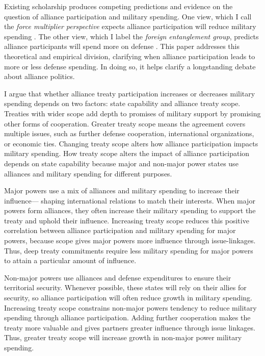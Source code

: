 \documentclass[12pt]{article}
\begin{document}
Existing scholarship produces competing predictions and evidence on the question of alliance participation and military spending. 
One view, which I call the \textit{force multiplier perspective} expects alliance participation will reduce military spending \citep{Morrow1993, Conybeare1994, DigiuseppePoast2016}. 
The other view, which I label the \textit{foreign entanglement group}, predicts alliance participants will spend more on defense \citep{Diehl1994, MorganPalmer2006}. 
This paper addresses this theoretical and empirical division, clarifying when alliance participation leads to more or less defense spending. 
In doing so, it helps clarify a longstanding debate about alliance politics.


I argue that whether alliance treaty participation increases or decreases military spending depends on two factors: state capability and alliance treaty scope. 
Treaties with wider scope add depth to promises of military support by promising other forms of cooperation.
Greater treaty scope means the agreement covers multiple issues, such as further defense cooperation, international organizations, or economic ties.  
Changing treaty scope alters how alliance participation impacts military spending. 
How treaty scope alters the impact of alliance participation depends on state capability because major and non-major power states use alliances and military spending for different purposes. 


Major powers use a mix of alliances and military spending to increase their influence--- shaping international relations to match their interests.
When major powers form alliances, they often increase their military spending to support the treaty and uphold their influence. 
Increasing treaty scope reduces this positive correlation between alliance participation and military spending for major powers, because scope gives major powers more influence through issue-linkages.
Thus, deep treaty commitments require less military spending for major powers to attain a particular amount of influence. 


Non-major powers use alliances and defense expenditures to ensure their territorial security.
Whenever possible, these states will rely on their allies for security, so alliance participation will often reduce growth in military spending.   
Increasing treaty scope constrains non-major powers tendency to reduce military spending through alliance participation. 
Adding further cooperation makes the treaty more valuable and gives partners greater influence through issue linkages. 
Thus, greater treaty scope will increase growth in non-major power military spending. 
\end{document}
